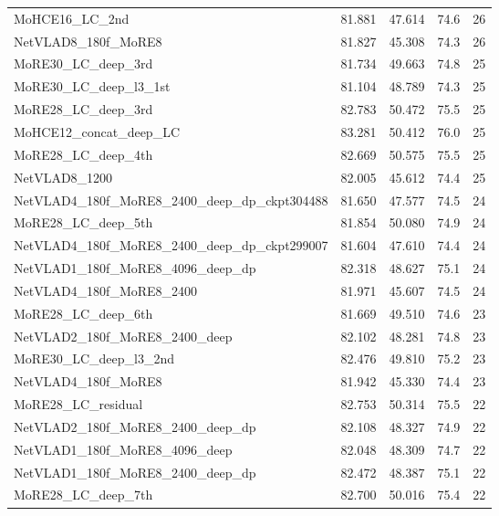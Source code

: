 \documentclass[10pt,twocolumn,letterpaper]{article}
\begin{document}
\begin{appendices}
\begin{table*}[t]
\begin{tabular}{lP{1.5cm}P{1.5cm}P{1.5cm}P{2.5cm}}
MoHCE16\_LC\_2nd                                 &  81.881  &  47.614  &  74.6  &  26 \\
NetVLAD8\_180f\_MoRE8                           &  81.827  &  45.308  &  74.3  &  26 \\
MoRE30\_LC\_deep\_3rd                            &  81.734  &  49.663  &  74.8  &  25 \\
MoRE30\_LC\_deep\_l3\_1st                        &  81.104  &  48.789  &  74.3  &  25 \\
MoRE28\_LC\_deep\_3rd                            &  82.783  &  50.472  &  75.5  &  25 \\
MoHCE12\_concat\_deep\_LC                        &  83.281  &  50.412  &  76.0  &  25 \\
MoRE28\_LC\_deep\_4th                            &  82.669  &  50.575  &  75.5  &  25 \\
NetVLAD8\_1200                                  &  82.005  &  45.612  &  74.4  &  25 \\
NetVLAD4\_180f\_MoRE8\_2400\_deep\_dp\_ckpt304488  &  81.650  &  47.577  &  74.5  & 24  \\
MoRE28\_LC\_deep\_5th                            &  81.854  &  50.080  &  74.9  &  24 \\
NetVLAD4\_180f\_MoRE8\_2400\_deep\_dp\_ckpt299007  &  81.604  &  47.610  &  74.4  & 24  \\
NetVLAD1\_180f\_MoRE8\_4096\_deep\_dp           &  82.318  &  48.627  &  75.1  &  24 \\
NetVLAD4\_180f\_MoRE8\_2400                     &  81.971  &  45.607  &  74.5  &  24 \\
MoRE28\_LC\_deep\_6th                            &  81.669  &  49.510  &  74.6  &  23 \\
NetVLAD2\_180f\_MoRE8\_2400\_deep               &  82.102  &  48.281  &  74.8  &  23 \\
MoRE30\_LC\_deep\_l3\_2nd                        &  82.476  &  49.810  &  75.2  &  23 \\
NetVLAD4\_180f\_MoRE8                           &  81.942  &  45.330  &  74.4  &  23 \\
MoRE28\_LC\_residual                             &  82.753  &  50.314  &  75.5  &  22 \\
NetVLAD2\_180f\_MoRE8\_2400\_deep\_dp           &  82.108  &  48.327  &  74.9  &  22 \\
NetVLAD1\_180f\_MoRE8\_4096\_deep               &  82.048  &  48.309  &  74.7  &  22 \\
NetVLAD1\_180f\_MoRE8\_2400\_deep\_dp           &  82.472  &  48.387  &  75.1  &  22 \\
MoRE28\_LC\_deep\_7th                            &  82.700  &  50.016  &  75.4  &  22 \\
 \hline
\end{tabular}
\end{table*}













\end{appendices}
\end{document}
